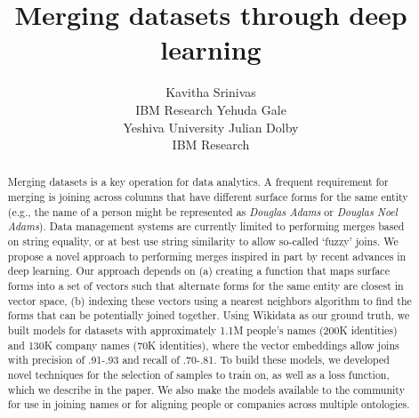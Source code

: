 \documentclass[letterpaper]{article} %
\begin{document}
%
\title{Merging datasets through deep learning}


\author{Kavitha Srinivas \\ IBM Research
\And Yehuda Gale \\ Yeshiva University
\And Julian Dolby \\ IBM Research}


\maketitle
\begin{abstract}
Merging datasets is a key operation for data analytics.  A frequent requirement for merging is joining across columns that have different surface forms for the same entity (e.g., the name of a person might be represented as \textit{Douglas Adams} or \textit{Douglas Noel Adams}).  Data management systems are currently limited to performing merges based on string equality, or at best use string similarity to allow so-called `fuzzy' joins.  We propose a novel approach to performing merges inspired in part by recent advances in deep learning.  Our approach depends on (a) creating a function that maps surface forms into a set of vectors such that alternate forms for the same entity are closest in vector space, (b) indexing these vectors using a nearest neighbors algorithm to find the forms that can be potentially joined together.  Using Wikidata as our ground truth, we built models for datasets with approximately 1.1M people's names (200K identities) and 130K company names (70K identities), where the vector embeddings allow joins with precision of .91-.93 and recall of .70-.81. To build these models, we developed novel techniques for the selection of samples to train on, as well as a loss function, which we describe in the paper.  We also make the models available to the community for use in joining names or for aligning people or companies across multiple ontologies.
  
\end{abstract}






  
  
  
\end{document}
